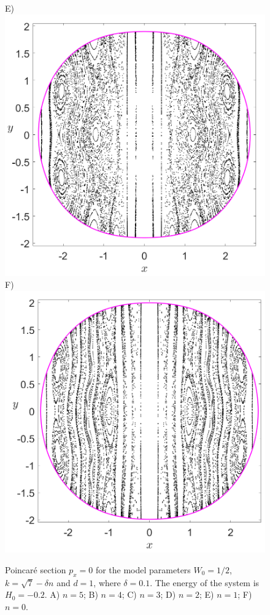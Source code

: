 \documentclass[10pt,aps,onecolumn,superscriptaddress]{revtex4-2}
\begin{document}
\begin{figure}[htbp]
	E)\includegraphics[scale=0.3]{PS_px_0_H_-0_2_w0_1div2_k_sqrt7_min_1delta_d_1.png}
	F)\includegraphics[scale=0.3]{PS_px_0_H_-0_2_w0_1div2_k_sqrt7_min_0delta_d_1.png}
	\caption{Poincar\'e section $p_x = 0$ for the model parameters $W_0 = 1/2$, $k = \sqrt{7} - \delta n$ and $d = 1$, where $\delta = 0.1$. The energy of the system is $H_0 = -0.2$. A) $n = 5$; B) $n = 4$; C) $n = 3$; D) $n = 2$; E) $n = 1$; F) $n = 0$.}
	\label{fig:psecBifProc_px_0}
\end{figure}
\end{document}
